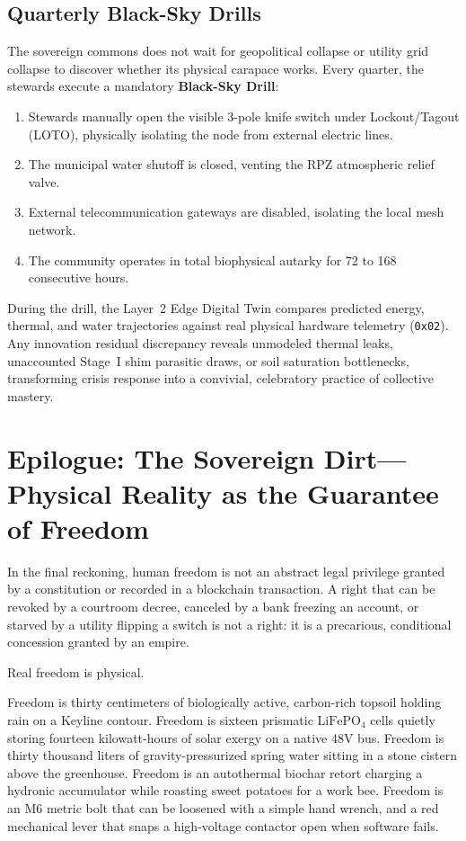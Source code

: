 \subsection{Quarterly Black-Sky Drills}
The sovereign commons does not wait for geopolitical collapse or utility grid collapse to discover whether its physical carapace works. Every quarter, the stewards execute a mandatory \textbf{Black-Sky Drill}:
\begin{enumerate}
    \item Stewards manually open the visible 3-pole knife switch under Lockout/Tagout (LOTO), physically isolating the node from external electric lines.
    \item The municipal water shutoff is closed, venting the RPZ atmospheric relief valve.
    \item External telecommunication gateways are disabled, isolating the local mesh network.
    \item The community operates in total biophysical autarky for 72 to 168 consecutive hours.
\end{enumerate}
During the drill, the Layer~2 Edge Digital Twin compares predicted energy, thermal, and water trajectories against real physical hardware telemetry (\texttt{0x02}). Any innovation residual discrepancy reveals unmodeled thermal leaks, unaccounted Stage~I shim parasitic draws, or soil saturation bottlenecks, transforming crisis response into a convivial, celebratory practice of collective mastery.

\section{Epilogue: The Sovereign Dirt---Physical Reality as the Guarantee of Freedom}
\label{sec:epilogue_sovereign_dirt}

In the final reckoning, human freedom is not an abstract legal privilege granted by a constitution or recorded in a blockchain transaction. A right that can be revoked by a courtroom decree, canceled by a bank freezing an account, or starved by a utility flipping a switch is not a right: it is a precarious, conditional concession granted by an empire.

Real freedom is physical.

Freedom is thirty centimeters of biologically active, carbon-rich topsoil holding rain on a Keyline contour. Freedom is sixteen prismatic $\mathrm{LiFePO}_4$ cells quietly storing fourteen kilowatt-hours of solar exergy on a native 48V bus. Freedom is thirty thousand liters of gravity-pressurized spring water sitting in a stone cistern above the greenhouse. Freedom is an autothermal biochar retort charging a hydronic accumulator while roasting sweet potatoes for a work bee. Freedom is an M6 metric bolt that can be loosened with a simple hand wrench, and a red mechanical lever that snaps a high-voltage contactor open when software fails.

